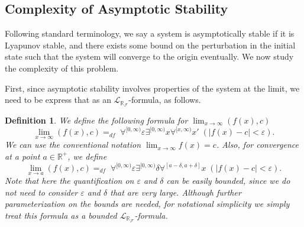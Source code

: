\documentclass[12pt]{article}
\theoremstyle{plain}
\newtheorem{definition}[theorem]{Definition}
\theoremstyle{definition}
\newcommand{\lrf}{\mathcal{L}_{\mathbb{R}_{\mathcal{F}}}}
\begin{document}
\subsection{Complexity of Asymptotic Stability}

Following standard terminology, we say a system is asymptotically stable if it is Lyapunov stable, and there exists some bound on the perturbation in the initial state such that the system will converge to the origin eventually. We now study the complexity of this problem.

First, since asymptotic stability involves properties of the system at the limit, we need to be express that as an $\lrf$-formula, as follows.
\begin{definition}
We define the following formula for $\lim_{x\rightarrow \infty}(f(x), c)$
$$\lim_{x\rightarrow \infty}(f(x), c) =_{df}\; \forall^{[0,\infty)} \varepsilon \exists^{[0,\infty)} x \forall^{[x,\infty)}x'  \; (|f(x) - c|<\varepsilon).$$
We can use the conventional notation $\lim_{x\rightarrow \infty} f(x) = c$. Also, for convergence at a point $a\in \mathbb{R}^+$, we define
$$\lim_{x\rightarrow a}(f(x), c) =_{df}\; \forall^{[0,\infty)} \varepsilon \exists^{[0,\infty)} \delta \forall^{[a-\delta,a+\delta]}x  \; (|f(x) - c|<\varepsilon).$$
Note that here the quantification on $\varepsilon$ and $\delta$ can be easily bounded, since we do not need to consider $\varepsilon$ and $\delta$ that are very large. Although further parameterization on the bounds are needed, for notational simplicity we simply treat this formula as a bounded $\lrf$-formula.
\end{definition}
\end{document}
